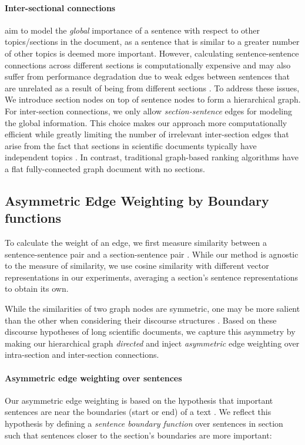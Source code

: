 \documentclass[11pt,a4paper]{article}
\begin{document}
\paragraph{Inter-sectional connections}
aim to model the \textit{global} importance of a sentence with respect to other topics/sections in the document, as a sentence that is similar to a greater number of other topics is deemed more important. However, calculating sentence-sentence connections across different sections is computationally expensive and may also suffer from performance degradation due to weak edges between sentences that are unrelated as a result of being from different sections \citep{mihalcea2004textrank}. To address these issues, We introduce section nodes on top of sentence nodes to form a hierarchical graph. For inter-section connections, we only allow \textit{section-sentence} edges for modeling the global information. This choice makes our approach more computationally efficient while greatly limiting the number of irrelevant inter-section edges that arise from the fact that sections in scientific documents typically have independent topics \citep{xiao2019extractive}.  In contrast, traditional graph-based ranking algorithms have a flat fully-connected graph document with no sections.

\subsection{Asymmetric Edge Weighting by Boundary functions}\label{sub-sec:method_edgeweights}
To calculate the weight of an edge, we first measure similarity between a sentence-sentence pair   and a section-sentence pair . While our method is agnostic to the measure of similarity, we use cosine similarity with different vector representations in our experiments, averaging a section's sentence representations to obtain its own. 

While the similarities of two graph nodes are symmetric, one may be more salient than the other when considering  their discourse structures \citep{baxendale1958machine,teufel1997sentence}.  Based on these discourse hypotheses of long scientific documents, we capture this asymmetry by making
our hierarchical graph \textit{directed} and inject \textit{asymmetric} edge weighting over intra-section and inter-section connections. 

\paragraph{Asymmetric edge weighting over sentences}
Our asymmetric edge weighting is based on the hypothesis that important sentences are near the boundaries (start or end) of a text \citep{baxendale1958machine}.  We reflect this hypothesis by defining a \textit{sentence boundary function}  over sentences  in section  such that sentences closer to the section's boundaries are more important:
\end{document}
